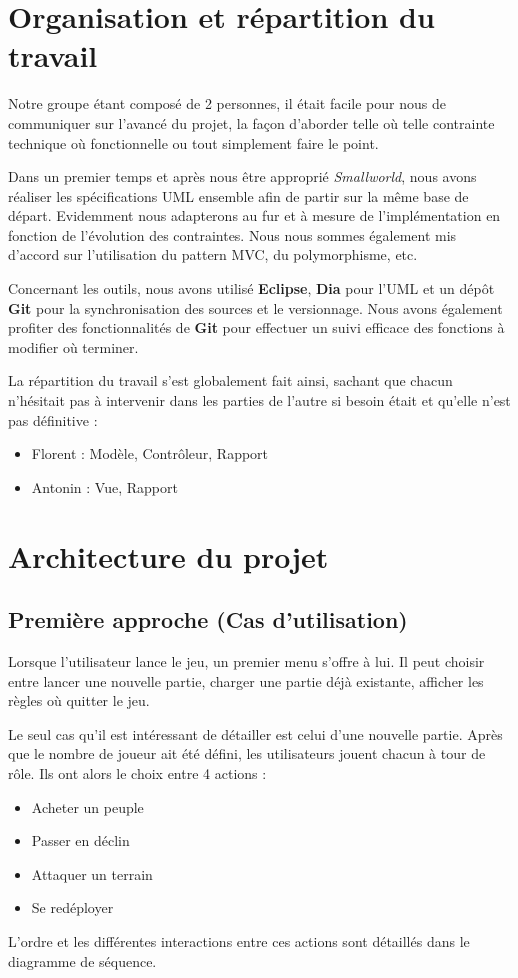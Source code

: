 \documentclass[a4paper]{report}
\begin{document}
\chapter{Organisation et répartition du travail}
\par
Notre groupe étant composé de 2 personnes, il était facile pour nous de
communiquer sur l'avancé du projet, la façon d'aborder telle où telle contrainte
technique où fonctionnelle ou tout simplement faire le point.
\par
Dans un premier temps et après nous être approprié \textit{Smallworld}, nous
avons réaliser les spécifications UML ensemble afin de partir sur la même base
de départ. Evidemment nous adapterons au fur et à mesure de l'implémentation en
fonction de l'évolution des contraintes. Nous nous sommes également mis d'accord
sur l'utilisation du pattern MVC, du polymorphisme, etc.
\par
Concernant les outils, nous avons utilisé \textbf{Eclipse}, \textbf{Dia} pour
l'UML et un dépôt \textbf{Git} pour la synchronisation des sources et le
versionnage. Nous avons également profiter des fonctionnalités de \textbf{Git}
pour effectuer un suivi efficace des fonctions à modifier où terminer.
\par
La répartition du travail s'est globalement fait ainsi, sachant que chacun
n'hésitait pas à intervenir dans les parties de l'autre si besoin était et qu'elle n'est pas définitive :
\begin{itemize}
    \item Florent : Modèle, Contrôleur, Rapport
    \item Antonin : Vue, Rapport
\end{itemize}
\newpage
\chapter{Architecture du projet}
\section{Première approche (Cas d'utilisation)}
Lorsque l'utilisateur lance le jeu, un premier menu s'offre à lui. Il peut choisir entre lancer une nouvelle partie, charger une partie déjà existante, afficher les règles où quitter le jeu.
\par Le seul cas qu'il est intéressant de détailler est celui d'une nouvelle partie. Après que le nombre de joueur ait été défini, les utilisateurs jouent chacun à tour de rôle. Ils ont alors le choix entre 4 actions :
\begin{itemize}
\item Acheter un peuple
\item Passer en déclin
\item Attaquer un terrain
\item Se redéployer
\end{itemize}
L'ordre et les différentes interactions entre ces actions sont détaillés dans le diagramme de séquence.
\end{document}
